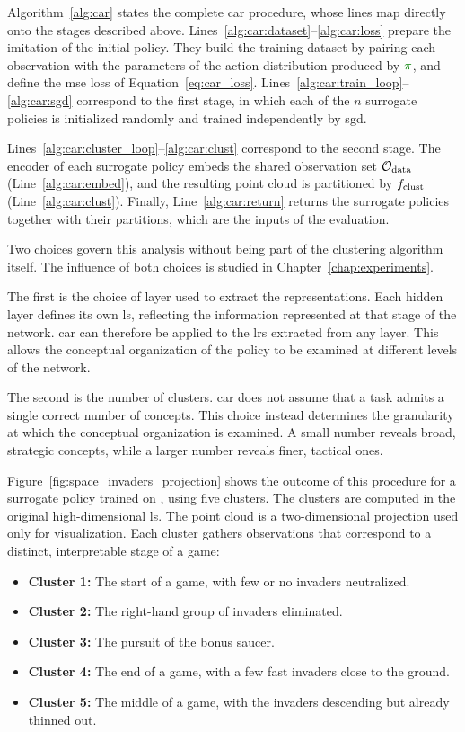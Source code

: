 Algorithm~\ref{alg:car} states the complete \gls{car} procedure, whose lines map directly onto the stages described above.
Lines~\ref{alg:car:dataset}--\ref{alg:car:loss} prepare the imitation of the initial policy.
They build the training dataset by pairing each observation with the parameters of the action distribution produced by $\InitialPolicy$, and define the \gls{mse} loss of Equation~\eqref{eq:car_loss}.
Lines~\ref{alg:car:train_loop}--\ref{alg:car:sgd} correspond to the first stage, in which each of the $n$ surrogate policies is initialized randomly and trained independently by \gls{sgd}.

Lines~\ref{alg:car:cluster_loop}--\ref{alg:car:clust} correspond to the second stage.
The encoder of each surrogate policy embeds the shared observation set $\mathcal{O}_{\mathrm{data}}$ (Line~\ref{alg:car:embed}), and the resulting point cloud is partitioned by $f_{\mathrm{clust}}$ (Line~\ref{alg:car:clust}).
Finally, Line~\ref{alg:car:return} returns the surrogate policies together with their partitions, which are the inputs of the evaluation.



Two choices govern this analysis without being part of the clustering algorithm itself.
The influence of both choices is studied in Chapter~\ref{chap:experiments}.

The first is the choice of layer used to extract the representations.
Each hidden layer defines its own \gls{ls}, reflecting the information represented at that stage of the network.
\gls{car} can therefore be applied to the \glspl{lr} extracted from any layer.
This allows the conceptual organization of the policy to be examined at different levels of the network.

The second is the number of clusters.
\gls{car} does not assume that a task admits a single correct number of concepts.
This choice instead determines the granularity at which the conceptual organization is examined.
A small number reveals broad, strategic concepts, while a larger number reveals finer, tactical ones.

Figure~\ref{fig:space_invaders_projection} shows the outcome of this procedure for a surrogate policy trained on \SpaceInvadersName, using five clusters.
The clusters are computed in the original high-dimensional \gls{ls}.
The point cloud is a two-dimensional projection used only for visualization.
Each cluster gathers observations that correspond to a distinct, interpretable stage of a game:
\begin{itemize}
    \item \textbf{Cluster 1:} The start of a game, with few or no invaders neutralized.
    \item \textbf{Cluster 2:} The right-hand group of invaders eliminated.
    \item \textbf{Cluster 3:} The pursuit of the bonus saucer.
    \item \textbf{Cluster 4:} The end of a game, with a few fast invaders close to the ground.
    \item \textbf{Cluster 5:} The middle of a game, with the invaders descending but already thinned out.
\end{itemize}

